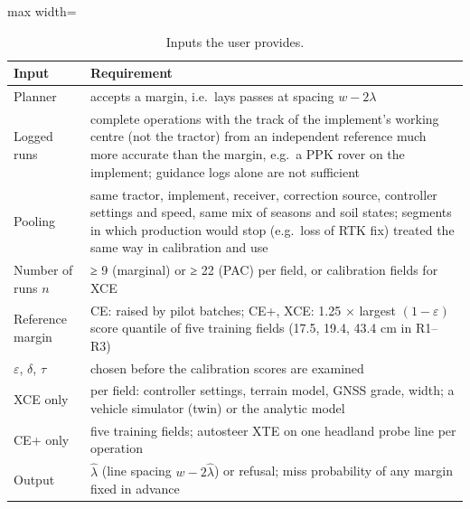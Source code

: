 \documentclass[preprint,12pt,authoryear]{elsarticle}
\begin{document}
\begin{table}[!htbp]
\centering
\footnotesize
\caption{Inputs the user provides.}\label{tab:1}
\begin{adjustbox}{max width=\textwidth}
\begin{tabular}{@{}l>{\raggedright\arraybackslash}p{20.8em}@{}}
\toprule
\textbf{Input} & \textbf{Requirement} \\
\midrule
Planner & accepts a margin, i.e.~lays passes at spacing \(w-2\lambda\) \\
Logged runs & complete operations with the track of the implement's working centre (not the tractor) from an independent reference much more accurate than the margin, e.g.~a PPK rover on the implement; guidance logs alone are not sufficient \\
Pooling & same tractor, implement, receiver, correction source, controller settings and speed, same mix of seasons and soil states; segments in which production would stop (e.g.~loss of RTK fix) treated the same way in calibration and use \\
Number of runs \(n\) & ≥ 9 (marginal) or ≥ 22 (PAC) per field, or calibration fields for XCE \\
Reference margin & CE: raised by pilot batches; CE+, XCE: 1.25 × largest \((1-\varepsilon)\) score quantile of five training fields (17.5, 19.4, 43.4 cm in R1--R3) \\
\(\varepsilon\), \(\delta\), \(\tau\) & chosen before the calibration scores are examined \\
XCE only & per field: controller settings, terrain model, GNSS grade, width; a vehicle simulator (twin) or the analytic model \\
CE+ only & five training fields; autosteer XTE on one headland probe line per operation \\
Output & \(\hat\lambda\) (line spacing \(w-2\hat\lambda\)) or refusal; miss probability of any margin fixed in advance \\
\bottomrule
\end{tabular}
\end{adjustbox}
\end{table}
\end{document}
